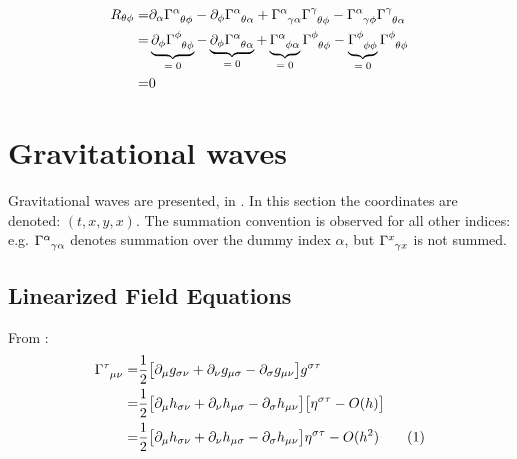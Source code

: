 \documentclass[]{article}
\newcommand\numberthis{\addtocounter{equation}{1}\tag{\theequation}}
\begin{document}
\begin{align*}
	R_{\theta\phi} =& \partial_\alpha \Gamma\indices{^\alpha_{\theta\phi}} - \partial_\phi \Gamma\indices{^\alpha_{\theta\alpha}} + \Gamma\indices{^\alpha_{\gamma\alpha}} \Gamma\indices{^\gamma_{\theta\phi}} - \Gamma\indices{^\alpha_{\gamma\phi}} \Gamma\indices{^\gamma_{\theta\alpha}}\\
	=& \underbrace{\partial_\phi \Gamma\indices{^\phi_{\theta\phi}}}_\text{$=0$} - \underbrace{\partial_\phi \Gamma\indices{^\alpha_{\theta\alpha}}}_\text{$=0$} + \underbrace{\Gamma\indices{^\alpha_{\phi\alpha}}}_\text{$=0$} \Gamma\indices{^\phi_{\theta\phi}} - \underbrace{\Gamma\indices{^\phi_{\phi\phi}}}_\text{$=0$} \Gamma\indices{^\phi_{\theta\phi}}\\
	=&0
\end{align*}

\section{Gravitational waves}\label{sec:gravitational:waves}

Gravitational waves are presented, in \cite[Lecture 10]{susskind2012general}.
In this section the coordinates are denoted: $(t,x,y,x)$. The summation convention is observed for all other indices: e.g. $\Gamma\indices{^\alpha_{\gamma\alpha}}$ denotes summation over the dummy index $\alpha$, but $\Gamma\indices{^x_{\gamma x}}$ is not summed.
\subsection{Linearized Field Equations}

From \cite[Lecture 10]{susskind2012general}:
\begin{align*}
	\Gamma\indices{^{\tau}_{\mu\nu}} =&\frac{1}{2} \big[ \partial_\mu g_{\sigma\nu} + \partial_\nu g_{\mu\sigma} - \partial_\sigma g_{\mu\nu}\big] g^{\sigma\tau}\\
	=& \frac{1}{2} \big[ \partial_\mu h_{\sigma\nu} + \partial_\nu h_{\mu\sigma} - \partial_\sigma h_{\mu\nu}\big] \big[\eta^{\sigma\tau }- O(h)\big]\\
	=& \frac{1}{2} \big[ \partial_\mu h_{\sigma\nu} + \partial_\nu h_{\mu\sigma} - \partial_\sigma h_{\mu\nu}\big] \eta^{\sigma\tau }- O(h^2) \numberthis \label{eq:Gamma:small}
\end{align*}
\end{document}
